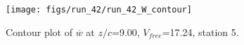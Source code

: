 \begin{figure}[H]
\centering
\texttt{[image: figs/run\_42/run\_42\_W\_contour]}
\caption{Contour plot of $\overline{w}$ at $z/c$=9.00, $V_{free}$=17.24, station 5.}
\label{fig:run_42_W_contour}
\end{figure}


